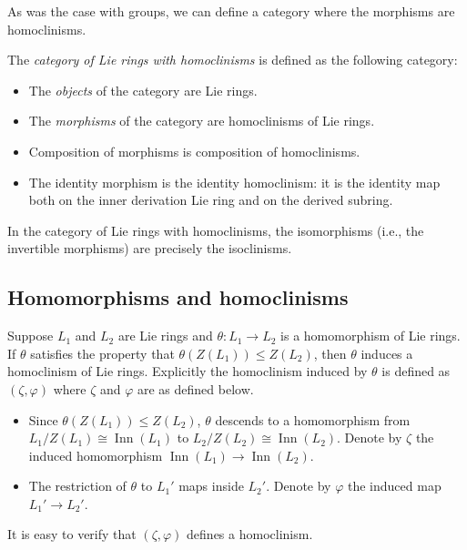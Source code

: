 As was the case with groups, we can define a category where the
morphisms are homoclinisms.

\begin{definer}
  The {\em category of Lie rings with homoclinisms} is defined as the
  following category:

  \begin{itemize}
  \item The {\em objects} of the category are Lie rings.
  \item The {\em morphisms} of the category are homoclinisms of Lie rings.
  \item Composition of morphisms is composition of homoclinisms.
  \item The identity morphism is the identity homoclinism: it is the
    identity map both on the inner derivation Lie ring and on the
    derived subring.
  \end{itemize}
\end{definer}

In the category of Lie rings with homoclinisms, the isomorphisms
(i.e., the invertible morphisms) are precisely the isoclinisms.

\subsection{Homomorphisms and homoclinisms}

Suppose $L_1$ and $L_2$ are Lie rings and $\theta: L_1 \to L_2$ is a
homomorphism of Lie rings. If $\theta$ satisfies the property that
$\theta(Z(L_1)) \le Z(L_2)$, then $\theta$ induces a homoclinism of
Lie rings. Explicitly the homoclinism induced by $\theta$ is defined as
$(\zeta,\varphi)$ where $\zeta$ and $\varphi$ are as defined below.

\begin{itemize}
\item Since $\theta(Z(L_1)) \le Z(L_2)$, $\theta$ descends to a
  homomorphism from $L_1/Z(L_1) \cong \operatorname{Inn}(L_1)$ to
  $L_2/Z(L_2) \cong \operatorname{Inn}(L_2)$. Denote by $\zeta$ the
  induced homomorphism $\operatorname{Inn}(L_1) \to
  \operatorname{Inn}(L_2)$.
\item The restriction of $\theta$ to $L_1'$ maps inside $L_2'$. Denote
  by $\varphi$ the induced map $L_1' \to L_2'$.
\end{itemize}

It is easy to verify that $(\zeta,\varphi)$ defines a homoclinism.

